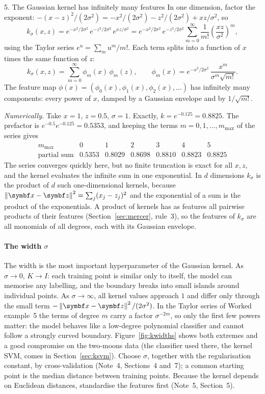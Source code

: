 \documentclass[11pt]{article}
\newcommand{\z}{\vect{z}}
\begin{document}
\begin{worked}{5. The Gaussian kernel has infinitely many features}
In one dimension, factor the exponent: $-(x - z)^2/(2\sigma^2) = -x^2/(2\sigma^2) - z^2/(2\sigma^2) + xz/\sigma^2$, so
\[
  k_\sigma(x, z) = e^{-x^2/2\sigma^2}\, e^{-z^2/2\sigma^2}\, e^{xz/\sigma^2}
  = e^{-x^2/2\sigma^2}\, e^{-z^2/2\sigma^2} \sum_{m=0}^\infty \frac{1}{m!}\left(\frac{xz}{\sigma^2}\right)^{\!m} ,
\]
using the Taylor series $e^u = \sum_m u^m/m!$. Each term splits into a function of $x$ times the same function of $z$:
\[
  k_\sigma(x, z) = \sum_{m=0}^\infty \phi_m(x)\,\phi_m(z), \qquad
  \phi_m(x) = e^{-x^2/2\sigma^2}\, \frac{x^m}{\sigma^m\sqrt{m!}} .
\]
The feature map $\phi(x) = (\phi_0(x), \phi_1(x), \phi_2(x), \dots)$ has infinitely many components: every power of
$x$, damped by a Gaussian envelope and by $1/\sqrt{m!}$.

\emph{Numerically.} Take $x = 1$, $z = 0.5$, $\sigma = 1$. Exactly, $k = e^{-0.125} = 0.8825$. The prefactor is
$e^{-0.5}e^{-0.125} = 0.5353$, and keeping the terms $m = 0, 1, \dots, m_{\max}$ of the series gives
\[
\begin{array}{c|cccccc}
m_{\max} & 0 & 1 & 2 & 3 & 4 & 5 \\ \hline
\text{partial sum} & 0.5353 & 0.8029 & 0.8698 & 0.8810 & 0.8823 & 0.8825
\end{array}
\]
The series converges quickly here, but no finite truncation is exact for all $x, z$, and the kernel evaluates the
infinite sum in one exponential. In $d$ dimensions $k_\sigma$ is the product of $d$ such one-dimensional kernels, because
$\norm{\x - \z}^2 = \sum_j (x_j - z_j)^2$ and the exponential of a sum is the product of the exponentials. A product of
kernels has as features all pairwise products of their features (Section~\ref{sec:mercer}, rule~3), so the features of
$k_\sigma$ are all monomials of all degrees, each with its Gaussian envelope.
\end{worked}

\paragraph{The width $\sigma$} The width is the most important hyperparameter of the Gaussian kernel. As $\sigma \to 0$,
$K \to I$: each training point is similar only to itself, the model can memorise any labelling, and the boundary breaks
into small islands around individual points. As $\sigma \to \infty$, all kernel values approach $1$ and differ only
through the small term $-\norm{\x - \z}^2/(2\sigma^2)$. In the Taylor series of Worked example~5 the terms of degree $m$
carry a factor $\sigma^{-2m}$, so only the first few powers matter: the model behaves like a low-degree polynomial
classifier and cannot follow a strongly curved boundary. Figure~\ref{fig:kwidths} shows both extremes and a good
compromise on the two-moons data (the classifier used there, the kernel SVM, comes in Section~\ref{sec:ksvm}). Choose $\sigma$, together with the regularisation constant, by cross-validation
(Note~4, Sections~4 and~7); a common starting point is the median distance between training points. Because the kernel
depends on Euclidean distances, standardise the features first (Note~5, Section~5).
\end{document}
